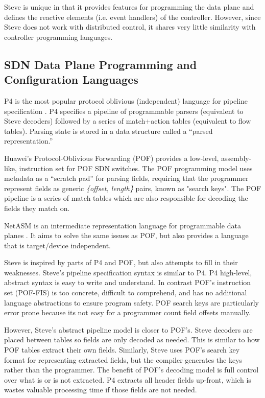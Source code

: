 Steve is unique in that it provides features for programming the data plane
and defines the reactive elements (i.e. event handlers) of the controller. However, since Steve
does not work with distributed control, it shares very little similarity with 
controller programming languages.

\subsection{SDN Data Plane Programming and Configuration Languages} \label{rel:p4}

P4 is the most popular protocol oblivious (independent) language for pipeline specification
 \cite{p4_spec, p4_spec2, p42014}.
P4 specifies a pipeline of programmable parsers (equivalent to Steve decoders) followed
by a series of match+action
tables (equivalent to flow tables). Parsing state is stored in a data structure
called a ``parsed representation.''

Huawei's Protocol-Oblivious Forwarding (POF) \cite{pof_fis, pof, pof_impl} provides a
low-level, assembly-like, instruction set for POF SDN switches. 
The POF programming model uses metadata as a ``scratch pad'' for parsing fields,
requiring that the programmer represent fields as generic \textit{\{offset, length\}} pairs, 
known as "search keys". The POF pipeline is a series of match tables which are also
responsible for decoding the fields they match on.

NetASM is an intermediate representation language for programmable data planes
\cite{shahbaz2015netasm}. It aims to solve the same issues as POF, but also provides a language that is target/device independent.

Steve is inspired by parts of P4 and POF, but also attempts to
fill in their weaknesses. 
Steve's pipeline specification syntax is similar to P4.
P4 high-level, abstract syntax is easy to write and understand. 
In contrast POF's instruction set (POF-FIS) \cite{pof_fis} is too
concrete, difficult to comprehend, and has no additional language
abstractions to ensure program safety.
POF search keys are particularly error prone because its not easy
for a programmer count field offsets manually.

However, Steve's abstract pipeline model is closer to POF's.
Steve decoders are placed between tables so fields are only decoded
as needed. This is similar to how POF tables extract their own fields.
Similarly, Steve uses POF's search key format for representing extracted fields, but the compiler generates the keys rather than the programmer.
The benefit of POF's decoding model is full control over what is or is not
extracted. P4 extracts all header fields up-front, which is wastes 
valuable processing time if those fields are not needed.




